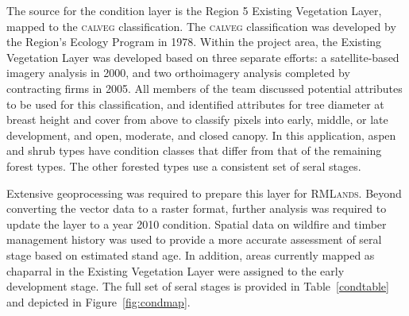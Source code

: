 The source for the condition layer is the Region 5 Existing Vegetation Layer, mapped to the \textsc{calveg} classification. The \textsc{calveg} classification was developed by the Region's Ecology Program in 1978. Within the project area, the Existing Vegetation Layer was developed based on three separate efforts: a satellite-based imagery analysis in 2000, and two orthoimagery analysis completed by contracting firms in 2005. All members of the team discussed potential attributes to be used for this classification, and identified attributes for tree diameter at breast height and cover from above to classify pixels into early, middle, or late development, and open, moderate, and closed canopy. In this application, aspen and shrub types have condition classes that differ from that of the remaining forest types. The other forested types use a consistent set of seral stages.

Extensive geoprocessing was required to prepare this layer for \textsc{RMLands}. Beyond converting the vector data to a raster format, further analysis was required to update the layer to a year 2010 condition. Spatial data on wildfire and timber management history was used to provide a more accurate assessment of seral stage based on estimated stand age. In addition, areas currently mapped as chaparral in the Existing Vegetation Layer were assigned to the early development stage. The full set of seral stages is provided in Table~\ref{condtable} and depicted in Figure~\ref{fig:condmap}.


